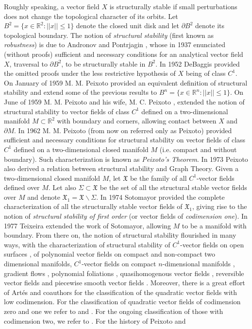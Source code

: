\documentclass[11pt]{amsart}
\begin{document}
Roughly speaking, a vector field $X$ is structurally stable if small perturbations does not change the topological character of its orbits. Let $B^2=\{x\in\mathbb{R}^2\colon ||x||\leqslant1\}$ denote the closed unit disk and let $\partial B^2$ denote its topological boundary. The notion of \emph{structural stability} (first known as \emph{robustness}) is due to Andronov and Pontrjagin \cite{AndPon1937}, whose in 1937 enunciated (without proofs) sufficient and necessary conditions for an analytical vector field $X$, traversal to $\partial B^2$, to be structurally stable in $B^2$. In 1952 DeBaggis \cite{Bag1952} provided the omitted proofs under the less restrictive hypothesis of $X$ being of class $C^1$. On January of 1959 M. M. Peixoto \cite{Pei1959} provided an equivalent definition of structural stability and extend some of the previous results to $B^n=\{x\in\mathbb{R}^n\colon ||x||\leqslant1\}$. On June of 1959 M. M. Peixoto and his wife, M. C. Peixoto \cite{PeiPei1959}, extended the notion of structural stability to vector fields of class $C^1$ defined on a two-dimensional manifold $M\subset\mathbb{R}^2$ with boundary and corners, allowing contact between $X$ and $\partial M$. In 1962 M. M. Peixoto \cite{Pei1962} (from now on referred only as Peixoto) provided sufficient and necessary conditions for structural stability on vector fields of class $C^1$ defined on a two-dimensional closed manifold $M$ (i.e. compact and without boundary). Such characterization is known as \emph{Peixoto's Theorem}. In 1973 Peixoto \cite{Pei1973} also derived a relation between structural stability and Graph Theory. Given a two-dimensional closed manifold $M$, let $\mathfrak{X}$ be the family of all $C^1$-vector fields defined over $M$. Let also $\Sigma\subset\mathfrak{X}$ be the set of all the structural stable vector fields over $M$ and denote $\mathfrak{X}_1=\mathfrak{X}\backslash\Sigma$. In 1974 Sotomayor \cite{Soto1974} provided the complete characterization of all the structurally stable vector fields of $\mathfrak{X}_1$, giving rise to the notion of \emph{structural stability of first order} (or vector fields of \emph{codimension one}). In 1977 Teixeira \cite{Tei1977} extended the work of Sotomayor, allowing $M$ to be a manifold with boundary. From there on, the notion of structural stability flourished in many ways, with the characterization of structural stability of $C^1$-vector fields on open surfaces \cite{Kot1982}, of polynomial vector fields on compact \cites{Soto1985,Cai1979,San1977,Vel} and non-compact \cites{Sha1987,DumSha1990} two dimensional manifolds, $C^1$-vector fields on compact $n$-dimensional manifolds \cite{Mar1961}, gradient flows \cite{Sha1990}, polynomial foliations \cite{JarLliSha2005}, quasihomogenous vector fields \cites{OliZha2014,AlgFueGamGar2018}, reversible vector fields \cite{BuzRobTei2021} and piecewise smooth vector fields \cites{BuzRodTei2022,PesSot2012}. Moreover, there is a great effort of Art\'es and coauthors for the classification of the quadratic vector fields with low codimension. For the classification of quadratic vector fields of codimension zero and one we refer to \cite{ArtKooLli} and \cite{ArtRezLli}. For the ongoing classification of those with codimension two, we refer to \cites{ArtOliRez,ArtMotRez,Art2024}. For the history of Peixoto and 
\end{document}
